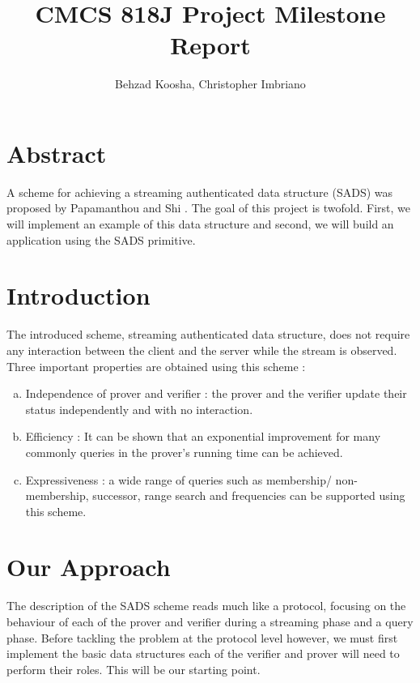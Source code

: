 \documentclass[11pt, letterpaper, oneside]{article}
\begin{document}
\title{CMCS 818J Project Milestone Report}
\author{Behzad Koosha, Christopher Imbriano}

\maketitle

\section{Abstract}

	A scheme for achieving a streaming authenticated data structure (SADS) was proposed by Papamanthou and Shi \cite{sads}.
	The goal of this project is twofold.
	First, we will implement an example of this data structure and second, we will build an application using the SADS primitive.


\section{Introduction}

	The introduced scheme, streaming authenticated data structure, does not require any interaction between the client and the server while the stream is observed.
	Three important properties are obtained using this scheme :
	\begin{enumerate}[a.]
	\item Independence of prover and verifier : the prover and the verifier update their status independently and with no interaction.
	\item Efficiency : It can be shown that an exponential improvement for many commonly queries in the prover's running time can be achieved.
	\item Expressiveness : a wide range of queries such as membership/ non-membership, successor, range search and frequencies can be supported using this scheme.
	\end{enumerate}

\section{Our Approach}

	The description of the SADS scheme reads much like a protocol, focusing on the behaviour of each of the prover and verifier during a streaming phase and a query phase.
	Before tackling the problem at the protocol level however, we must first implement the basic data structures each of the verifier and prover will need to perform their roles.
	This will be our starting point.
\end{document}
